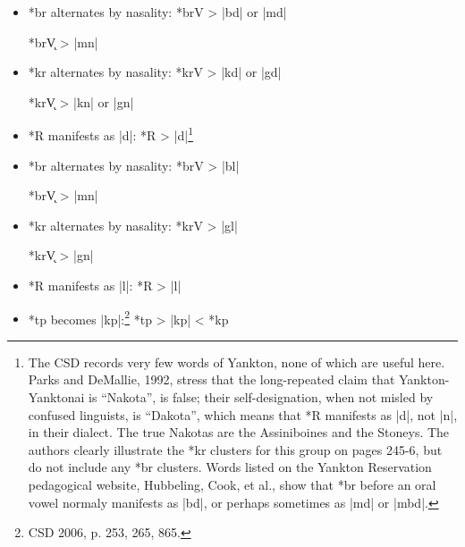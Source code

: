 \documentclass[output=paper]{LSP/langsci}
\begin{document}

\begin{itemize}
\item *br alternates by nasality: \hspace{1em} *brV	>	|bd| or |md|

\hspace{12em} *br\k{V} 	>	|mn|
\item  *kr alternates by nasality:  \hspace{1.2em} *krV       >          |kd| or |gd|

\hspace{12em} *kr\k{V} 	>	|kn| or |gn|

\item *R manifests as |d|: \hspace{4.5em} *R	>	|d|\footnote{The CSD records very few words of Yankton, none of which are useful here.  Parks and DeMallie, 1992, stress that the long-repeated claim that Yankton-Yanktonai is ``Nakota'', is false; their self-designation, when not misled by confused linguists, is ``Dakota'', which means that *R manifests as |d|, not |n|, in their dialect.  The true Nakotas are the Assiniboines and the Stoneys.  The authors clearly illustrate the *kr clusters for this group on pages 245-6, but do not include any *br clusters.  Words listed on the Yankton Reservation pedagogical website, Hubbeling, Cook, et al., show that *br before an oral vowel normaly manifests as |bd|, or perhaps sometimes as |md| or |mbd|.}
\end{itemize}


\begin{itemize}
\item  *br alternates by nasality:  \hspace{1em} *brV	>	|bl|

\hspace{12em} *br\k{V}	>	|mn|

\item  *kr alternates by nasality: \hspace{1em}   *krV       >          |gl|

\hspace{12em} *kr\k{V}	>	|gn|
\item *R manifests as |l|: \hspace{4.5em} *R	>	|l|
\item *tp becomes |kp|:\footnote{CSD 2006, p. 253, 265, 865.} \hspace{4.5em} *tp	>	|kp|	 <	*kp
 \end{itemize}
 
\end{document}
